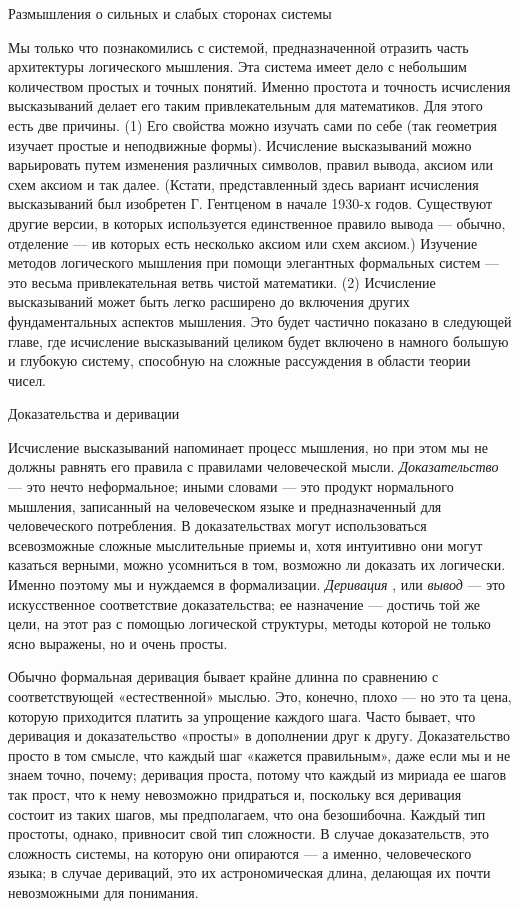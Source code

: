 Размышления о сильных и слабых сторонах системы

Мы только что познакомились с системой, предназначенной отразить часть архитектуры логического мышления. Эта система имеет дело с небольшим количеством простых и точных понятий. Именно простота и точность исчисления высказываний делает его таким привлекательным для математиков. Для этого есть две причины. (1) Его свойства можно изучать сами по себе (так геометрия изучает простые и неподвижные формы). Исчисление высказываний можно варьировать путем изменения различных символов, правил вывода, аксиом или схем аксиом и так далее. (Кстати, представленный здесь вариант исчисления высказываний был изобретен Г. Гентценом в начале 1930-х годов. Существуют другие версии, в которых используется единственное правило вывода --- обычно, отделение --- ив которых есть несколько аксиом или схем аксиом.) Изучение методов логического мышления при помощи элегантных формальных систем --- это весьма привлекательная ветвь чистой математики. (2) Исчисление высказываний может быть легко расширено до включения других фундаментальных аспектов мышления. Это будет частично показано в следующей главе, где исчисление высказываний целиком будет включено в намного большую и глубокую систему, способную на сложные рассуждения в области теории чисел.

Доказательства и деривации

Исчисление высказываний напоминает процесс мышления, но при этом мы не должны равнять его правила с правилами человеческой мысли. \emph{Доказательство} --- это нечто неформальное; иными словами --- это продукт нормального мышления, записанный на человеческом языке и предназначенный для человеческого потребления. В доказательствах могут использоваться всевозможные сложные мыслительные приемы и, хотя интуитивно они могут казаться верными, можно усомниться в том, возможно ли доказать их логически. Именно поэтому мы и нуждаемся в формализации. \emph{Деривация} , или \emph{вывод} --- это искусственное соответствие доказательства; ее назначение --- достичь той же цели, на этот раз с помощью логической структуры, методы которой не только ясно выражены, но и очень просты.

Обычно формальная деривация бывает крайне длинна по сравнению с соответствующей «естественной» мыслью. Это, конечно, плохо --- но это та цена, которую приходится платить за упрощение каждого шага. Часто бывает, что деривация и доказательство «просты» в дополнении друг к другу. Доказательство просто в том смысле, что каждый шаг «кажется правильным», даже если мы и не знаем точно, почему; деривация проста, потому что каждый из мириада ее шагов так прост, что к нему невозможно придраться и, поскольку вся деривация состоит из таких шагов, мы предполагаем, что она безошибочна. Каждый тип простоты, однако, привносит свой тип сложности. В случае доказательств, это сложность системы, на которую они опираются --- а именно, человеческого языка; в случае дериваций, это их астрономическая длина, делающая их почти невозможными для понимания.

